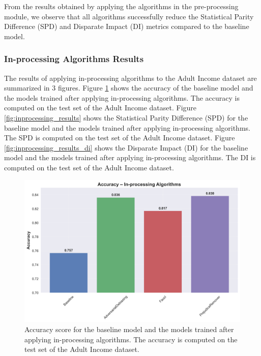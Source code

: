 \documentclass[12pt,a4paper,openright,twoside]{book}
\begin{document}
From the results obtained by applying the algorithms in the pre-processing module, we observe that all algorithms successfully reduce the Statistical Parity Difference (SPD) and Disparate Impact (DI) metrics compared to the baseline model.

\subsubsection{In-processing Algorithms Results}

The results of applying in-processing algorithms to the Adult Income dataset are summarized in 3 figures. Figure \ref{fig:baseline_results_inprocessing} shows the accuracy of the baseline model and the models trained after applying in-processing algorithms. The accuracy is computed on the test set of the Adult Income dataset.
Figure \ref{fig:inprocessing_results} shows the Statistical Parity Difference (SPD) for the baseline model and the models trained after applying in-processing algorithms. The SPD is computed on the test set of the Adult Income dataset. Figure \ref{fig:inprocessing_results_di} shows the Disparate Impact (DI) for the baseline model and the models trained after applying in-processing algorithms. The DI is computed on the test set of the Adult Income dataset.

\begin{figure}
    \centering
    \includegraphics[width=\textwidth]{figures/inprocessing_results/inprocessing_accuracy_comparison.png}
    \caption{Accuracy score for the baseline model and the models trained after applying in-processing algorithms. The accuracy is computed on the test set of the Adult Income dataset.}
    \label{fig:baseline_results_inprocessing}
\end{figure}
\end{document}
